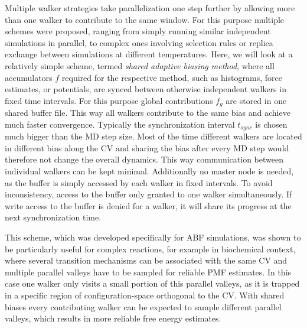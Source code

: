 Multiple walker strategies take parallelization one step further by allowing more than one walker to contribute to the same window.
For this purpose multiple schemes were proposed, ranging from simply running similar independent simulations in parallel, to complex ones involving selection rules or replica exchange between simulations at different temperatures.\autocite{wilson2011molecular,comer2014calculation,minoukadeh2010potential}
Here, we will look at a relatively simple scheme, termed \textit{shared adaptive biasing method}\autocite{comer2015adaptive}, where all accumulators $f$ required for the respective method, such as histograms, force estimates, or potentials, are synced between otherwise independent walkers in fixed time intervals. %
For this purpose global contributions $f_g$ are stored in one shared buffer file.
This way all walkers contribute to the same bias and achieve much faster convergence.
Typically the synchronization interval $t_{sync}$ is chosen much bigger than the MD step size.
Most of the time different walkers are located in different bins along the CV and sharing the bias after every MD step would therefore not change the overall dynamics.
This way communication between individual walkers can be kept minimal.
Additionally no master node is needed, as the buffer is simply accessed by each walker in fixed intervals.
To avoid inconsistency, access to the buffer only granted to one walker simultaneously.
If write access to the buffer is denied for a walker, it will share its progress at the next synchronization time.

This scheme, which was developed specifically for ABF simulations, was shown to be particularly useful for complex reactions, for example in biochemical context, where several transition mechanisms can be associated with the same CV and multiple parallel valleys have to be sampled for reliable PMF estimates.\autocite{minoukadeh2010potential}
In this case one walker only visits a small portion of this parallel valleys, as it is trapped in a specific region of configuration-space orthogonal to the CV.
With shared biases every contributing walker can be expected to sample different parallel valleys, which results in more reliable free energy estimates.
